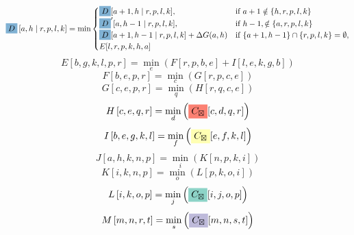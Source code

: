 \documentclass{article}
\begin{document}
$$ \colorbox{c4}{$D$} \left[a,h \mid  r,p,l,k \right] =  \min\begin{cases}\colorbox{c4}{$D$}[ a+1 , h\mid r,p,l,k ], &\text{if } a+1 \notin\{ h , r,p,l,k \} \\\colorbox{c4}{$D$}'[ a , h-1\mid r,p,l,k ], &\text{if } h-1 ,\notin\{ a , r,p,l,k \} \\\colorbox{c4}{$D$}[ a+1 , h-1\mid r,p,l,k ]+\Delta G(a,h) &\text{if } \{ a+1 , h-1 \}\cap \{ r,p,l,k \}=\emptyset,\\E[l,r,p,k,h,a]\end{cases}$$
$$ E\left[ b,g,k,l,p,r \right] =\min_{ e } \left( F[r,p,b,e]+I[l,e,k,g,b]\right) $$
$$ F\left[ b,e,p,r \right] =\min_{ c } \left( G[r,p,c,e]\right) $$
$$ G\left[ c,e,p,r \right] =\min_{ q } \left( H[r,q,c,e]\right) $$
$$ H\left[ c,e,q,r \right] =\min_{ d } \left( \colorbox{c3}{$C_{\boxtimes}$}[c,d,q,r]\right) $$
$$ I\left[ b,e,g,k,l \right] =\min_{ f } \left( \colorbox{c1}{$C_{\boxtimes}$}[e,f,k,l]\right) $$
$$ J\left[ a,h,k,n,p \right] =\min_{ i } \left( K[n,p,k,i]\right) $$
$$ K\left[ i,k,n,p \right] =\min_{ o } \left( L[p,k,o,i]\right) $$
$$ L\left[ i,k,o,p \right] =\min_{ j } \left( \colorbox{c0}{$C_{\boxtimes}$}[i,j,o,p]\right) $$
$$ M\left[ m,n,r,t \right] =\min_{ s } \left( \colorbox{c2}{$C_{\boxtimes}$}[m,n,s,t]\right) $$
\end{document}
